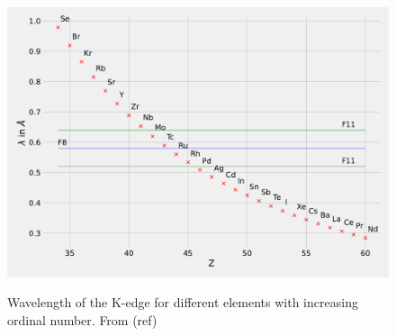 \begin{figure}[ht]
    \centering
    \includegraphics[angle = 90, width = 0.95\linewidth]{Programming/Absorption/Elements.pdf}
    \label{fig:Elements}
    \caption{Wavelength of the K-edge for different elements with increasing ordinal number. From (ref)}
\end{figure}



\